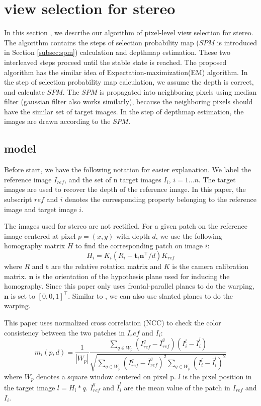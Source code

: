 \section{view selection for stereo} \label{sec:view_selection_stereo}

In this section , we describe our algorithm of pixel-level view selection for stereo. The algorithm contains the steps of selection probability map ($SPM$ is introduced in Section \ref{subsec:spm}) calculation and depthmap estimation. These two interleaved steps proceed until the stable state is reached. The proposed algorithm has the similar idea of Expectation-maximization(EM) algorithm. In the step of selection probability map calculation, we assume the depth is correct, and calculate $SPM$. The $SPM$ is propagated into neighboring pixels using median filter (gaussian filter also works similarly), because the neighboring pixels should have the similar set of target images. In the step of depthmap estimation, the images are drawn according to the $SPM$.

\subsection{model}
Before start, we have the following notation for easier explanation.  We label the reference image $I_{ref}$, and the set of n target images $I_i$, $i = 1...n$. The target images are used to recover the depth of the reference image. In this paper, the subscript $ref$ and $i$ denotes the corresponding property belonging to the reference image and target image $i$.

The images used for stereo are not rectified. For a given patch on the reference image centered at pixel $p = (x,y)$ with depth $d$, we use the following homography matrix $H$ to find the corresponding patch on image $i$:
\begin{equation}
H_i = K_i(R_i - \textbf{t}_i\textbf{n}^\intercal/d )K_{ref}
\end{equation}  \label{equ:homography}
where $R$ and $\textbf{t}$ are the relative rotation matrix and $K$ is the camera calibration matrix. $\textbf{n}$ is the orientation of the hypothesis plane used for inducing the homography. Since this paper only uses frontal-parallel planes to do the warping, $\textbf{n}$ is set to $[0,0,1]^\intercal$. Similar to \cite{patchMatchStereo1}\cite{patchMatchStereo2}, we can also use slanted planes to do the warping.

This paper uses normalized cross correlation (NCC) to check the color consistency between the two patches in $I_ref$ and $I_i$:
\begin{equation}
    m_i(p,d) = \frac{1}{|W_p|} \frac{\sum\limits_{q\in{W_p}}{(I_{ref}^q - \bar{I}_{ref}^q)  (I_{i}^l - \bar{I}_{i}^l)}}
        {\sqrt{\sum\limits_{q\in{W_p}}{(I_{ref}^q - \bar{I}_{ref}^q)^2}  \sum\limits_{q\in{W_p}}{(I_{i}^l - \bar{I}_{i}^l)^2}    } }   \label{equ:ncc}
\end{equation}
where $W_p$ denotes a square window centered on pixel p. $l$ is the pixel position in the target image $l = H_i*q$. $\bar{I}_{ref}^q$ and $\bar{I}_{i}^l$ are the mean value of the patch in $I_{ref}$ and $I_i$.

